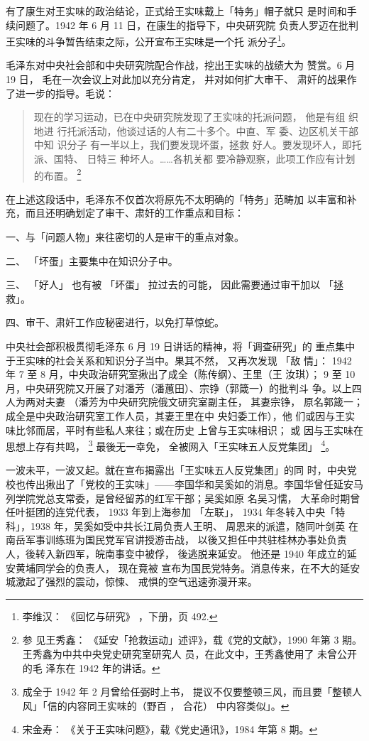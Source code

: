 有了康生对王实味的政治结论，正式给王实味戴上「特务」帽子就只
是时间和手续问题了。1942 年 6 月 11 日，在康生的指导下，中央研究院
负责人罗迈在批判王实味的斗争暂告结束之际，公开宣布王实味是一个托
派分子\footnote{李维汉：
《回忆与研究》
，下册，页 492.}。

毛泽东对中央社会部和中央研究院配合作战，挖出王实味的战绩大为
赞赏。6 月 19 日，
毛在一次会议上对此加以充分肯定，
并对如何扩大审干、
肃奸的战果作了进一步的指导。毛说：
\begin{quote}
{\fzwkai 现在的学习运动，已在中央研究院发现了王实味的托派问题， 他是有组
织地进 行托派活动，他谈过话的人有二十多个。中直、军 委、边区机关干部中知
识分子 有一半以上，我们要发现坏蛋，拯救 好人。要发现坏人，即托派、国特、
日特三 种坏人。……各机关都 要冷静观察，此项工作应有计划的布置。
\footnote{参 见王秀鑫： 《延安「抢救运动」述评》，载《党的文献》，1990
年第 3 期。王秀鑫为中共中央党史研究室研究人 员，在此文中，王秀鑫使用了
未曾公开的毛 泽东在 1942 年的讲话。}} 
\end{quote}

在上述这段话中，毛泽东不仅首次将原先不太明确的「特务」范畴加
以丰富和补充，而且还明确划定了审干、肃奸的工作重点和目标：

一、与「问题人物」来往密切的人是审干的重点对象。

二、
「坏蛋」主要集中在知识分子中。

三、
「好人」
也有被
「坏蛋」
拉过去的可能，
因此需要通过审干加以
「拯
救」。

四、审干、肃奸工作应秘密进行，以免打草惊蛇。

中央社会部积极贯彻毛泽东 6 月 19 日讲话的精神，将「调查研究」的 重点集中
于王实味的社会关系和知识分子当中。果其不然， 又再次发现 「敌 情」：
1942 年 7 至 8 月，中央政治研究室揪出了成全（陈传纲）、王里（王 汝琪）；
9 至 10 月，中央研究院又开展了对潘芳（潘蕙田）、宗铮（郭箴一）的批判斗
争。以上四人为两对夫妻 （潘芳为中央研究院俄文研究室副主任， 其妻宗铮，
原名郭箴一；成全是中央政治研究室工作人员，其妻王里在中 央妇委工作），他
们或因与王实味比邻而居，平时有些私人来往；或在历史 上曾与王实味相识； 或
因与王实味在思想上存有共鸣， \footnote{成全于 1942 年 2 月曾给任弼时上书，
提议不仅要整顿三风，而且要「整顿人风」「信的内容同王实味的（野百 ， 合花）
中内容类似」。} 最後无一幸免， 全被网入「王实味五人反党集团」
\footnote{宋金寿： 《关于王实味问题》，载《党史通讯》，1984 年第 8
期。}。

一波未平，一波又起。就在宣布揭露出「王实味五人反党集团」的同 时，中央党
校也传出揪出了「党校的王实味」——李国华和吴奚如的消息。李国华曾任延安马
列学院党总支常委，是曾经留苏的红军干部；吴奚如原 名吴习懦， 大革命时期曾
任叶挺团的连党代表， 1933 年到上海参加 「左联」， 1934 年冬转入中央「特
科」，1938 年，吴奚如受中共长江局负责人王明、 周恩来的派遣，随同叶剑英
在南岳军事训练班为国民党军官讲授游击战， 以後又担任中共驻桂林办事处负责
人，後转入新四军，皖南事变中被俘， 後逃脱来延安。
他还是 1940 年成立的延安黄埔同学会的负责人，
现在竟被
宣布为国民党特务。消息传来，在不大的延安城激起了强烈的震动，惊悚、
戒惧的空气迅速弥漫开来。

